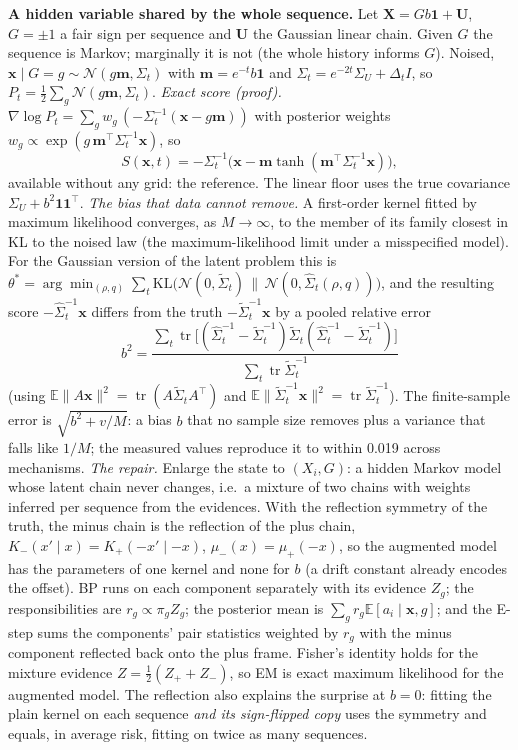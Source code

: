 \textbf{A hidden variable shared by the whole sequence.} Let $\mathbf X=Gb\mathbf 1+\mathbf U$, $G=\pm1$ a fair sign per sequence and $\mathbf U$ the Gaussian linear chain. Given $G$ the sequence is Markov; marginally it is not (the whole history informs $G$). Noised, $\mathbf x\mid G{=}g\sim\mathcal N(g\mathbf m,\Sigma_t)$ with $\mathbf m=e^{-t}b\mathbf 1$ and
$\Sigma_t=e^{-2t}\Sigma_U+\Delta_tI$, so $P_t=\tfrac12\sum_g\mathcal N(g\mathbf m,\Sigma_t)$. \emph{Exact score (proof).} $\nabla\log P_t=\sum_gw_g\,(-\Sigma_t^{-1}(\mathbf x-g\mathbf m))$ with posterior weights $w_g\propto\exp(g\,\mathbf m^{\top}\Sigma_t^{-1}\mathbf x)$, so
\begin{equation}
S(\mathbf x,t)=-\Sigma_t^{-1}\big(\mathbf x-\mathbf m\tanh(\mathbf m^{\top}\Sigma_t^{-1}\mathbf x)\big),
\end{equation}
available without any grid: the reference. The linear floor uses the true covariance $\Sigma_U+b^2\mathbf 1\mathbf 1^{\top}$.
\emph{The bias that data cannot remove.} A first-order kernel fitted by maximum likelihood converges, as $M\to\infty$, to the member of its family closest in KL to the noised law (the maximum-likelihood limit under a misspecified model). For the Gaussian version of the latent problem this is
$\theta^*=\arg\min_{(\rho,q)}\sum_t\mathrm{KL}\big(\mathcal N(0,\tilde\Sigma_t)\,\|\,\mathcal N(0,\hat\Sigma_t(\rho,q))\big)$, and the resulting score $-\hat\Sigma_t^{-1}\mathbf x$ differs from the truth $-\tilde\Sigma_t^{-1}\mathbf x$ by a pooled relative error
\begin{equation}
b^2=\frac{\sum_t\operatorname{tr}\big[(\hat\Sigma_t^{-1}-\tilde\Sigma_t^{-1})\tilde\Sigma_t(\hat\Sigma_t^{-1}-\tilde\Sigma_t^{-1})\big]}{\sum_t\operatorname{tr}\tilde\Sigma_t^{-1}}
\end{equation}
(using $\mathbb E\|A\mathbf x\|^2=\operatorname{tr}(A\tilde\Sigma_tA^{\top})$ and $\mathbb E\|\tilde\Sigma_t^{-1}\mathbf x\|^2=\operatorname{tr}\tilde\Sigma_t^{-1}$). The finite-sample error is $\sqrt{b^2+v/M}$: a bias $b$ that no sample size removes plus a variance that falls like $1/M$; the measured values reproduce it to within 0.019 across mechanisms.
\emph{The repair.} Enlarge the state to $(X_i,G)$: a hidden Markov model whose latent chain never changes, i.e.\ a mixture of two chains with weights inferred per sequence from the evidences. With the reflection symmetry of the truth, the minus chain is the reflection of the plus chain, $K_-(x'\mid x)=K_+(-x'\mid-x)$, $\mu_-(x)=\mu_+(-x)$, so the augmented model has the parameters of one kernel and none for $b$ (a drift constant already encodes the offset).
BP runs on each component separately with its evidence $Z_g$; the responsibilities are $r_g\propto\pi_gZ_g$; the posterior mean is $\sum_gr_g\mathbb E[a_i\mid\mathbf x,g]$; and the E-step sums the components' pair statistics weighted by $r_g$ with the minus component reflected back onto the plus frame. Fisher's identity holds for the mixture evidence
$Z=\tfrac12(Z_++Z_-)$, so EM is exact maximum likelihood for the augmented model. The reflection also explains the surprise at $b=0$: fitting the plain kernel on each sequence \emph{and its sign-flipped copy} uses the symmetry and equals, in average risk, fitting on twice as many sequences.

